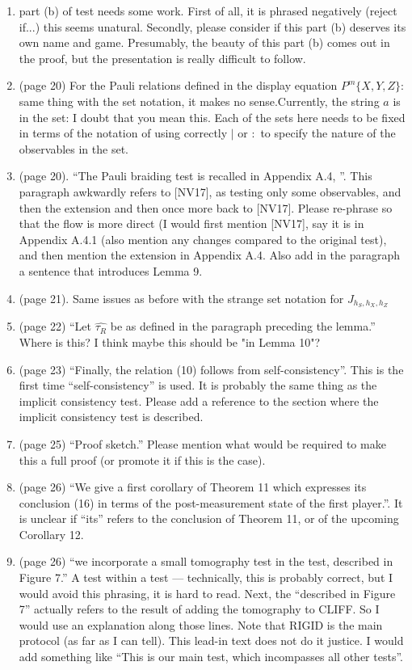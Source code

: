 \documentclass[12pt]{article}
\begin{document}
\begin{enumerate}
     \item part (b) of test needs some work. First of all, it is phrased negatively (reject if...) this seems unatural. Secondly, please consider if this part (b) deserves its own name and game. Presumably, the beauty of this part (b) comes out in the proof, but the presentation is really difficult to follow.
   \item (page 20) For the Pauli relations defined in the display equation $P^m\{X,Y,Z\}$: same thing with the set notation, it makes no sense.Currently, the string $a$ is in the set: I doubt that you mean this. Each of the sets here needs to be fixed in terms of the notation of using correctly $\mid$ or $:$ to specify the nature of the observables in the set.
    \item (page 20). ``The Pauli braiding test is recalled in Appendix A.4, ''. This paragraph awkwardly refers to [NV17], as testing only some observables, and then the extension and then once more back to [NV17]. Please re-phrase so that the flow is more direct (I would first mention [NV17], say it is in Appendix A.4.1 (also mention any changes compared to the original test), and then mention the extension in Appendix A.4. Also add in the paragraph a sentence that introduces Lemma 9.
     \item (page 21). Same issues as before with the strange set notation for $J_{h_S, h_X, h_Z}$
\item (page 22) ``Let $\hat{\tau_R}$ be as defined in the paragraph preceding the lemma.'' Where is this? I think maybe this should be "in Lemma 10"?
\item (page 23) ``Finally, the relation (10) follows from self-consistency''. This is the first time ``self-consistency'' is used. It is probably the same thing as the implicit consistency test. Please add a reference to the section where the implicit consistency test is described.
 \item (page 25) ``Proof sketch.'' Please mention what would be required to make this a full proof (or promote it if this is the case).
 \item (page 26) ``We give a first corollary of Theorem 11 which expresses its conclusion (16) in terms of the post-measurement
state of the first player.''. It is unclear if ``its'' refers to the conclusion of Theorem 11, or of the upcoming Corollary 12.
\item (page 26) ``we incorporate a
small tomography test in the test, described in Figure 7.'' A test within a test --- technically, this is probably correct, but I would avoid this phrasing, it is hard to read. Next, the ``described in Figure 7'' actually refers to the result of adding the tomography to CLIFF. So I would use an explanation along those lines. Note that RIGID is the main protocol (as far as I can tell). This lead-in text does not do it justice. I would add something like ``This is our main test, which incompasses all other tests''.

\end{enumerate}
\end{document}
